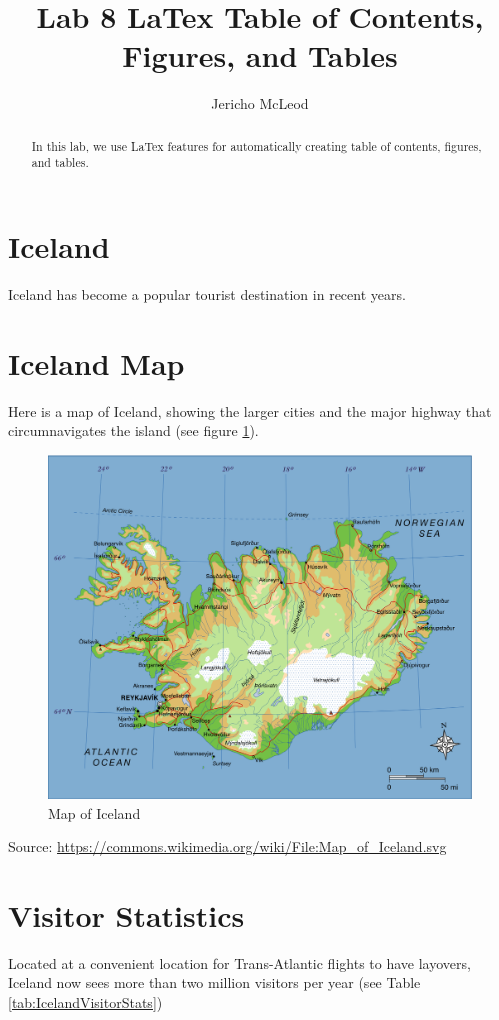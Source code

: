 \documentclass[11pt]{article}
\title{Lab 8 LaTex Table of Contents, Figures, and Tables}
\author{Jericho McLeod}
\begin{document}
\maketitle

\begin{abstract}
In this lab, we use LaTex features for automatically creating table of contents, figures, and tables.
\end{abstract}

\tableofcontents
\listoffigures
\listoftables
\newpage

\section{Iceland}
Iceland has become a popular tourist destination in recent years. 

\newpage %
\section{Iceland  Map}
Here is a map of Iceland, showing the larger cities and the major highway that circumnavigates the island (see figure \ref{fig:IcelandMap}).
\begin{figure}[h!]
	\centering
	\includegraphics[width=0.7\linewidth]{Map_of_Iceland.png}
	\caption{Map of Iceland}
	\label{fig:IcelandMap}
\end{figure}

Source: \url{https://commons.wikimedia.org/wiki/File:Map_of_Iceland.svg}

\newpage
\section{Visitor Statistics}
Located at a convenient location for Trans-Atlantic flights to have layovers, Iceland now sees more than two million visitors per year (see Table \ref{tab:IcelandVisitorStats})
\end{document}
